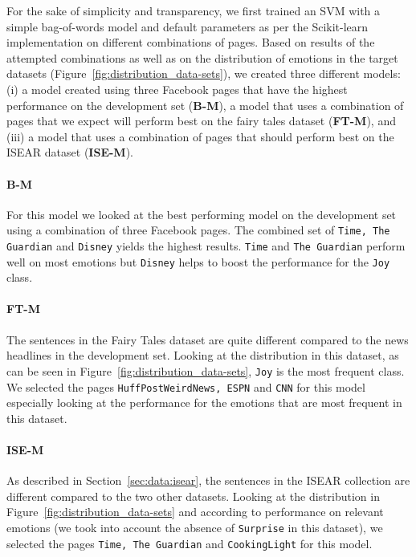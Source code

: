 \documentclass[11pt]{article}
\begin{document}
For the sake of simplicity and transparency, we first trained an SVM with a simple bag-of-words model and default parameters as per the Scikit-learn implementation \cite{scikit-learn} on different combinations of pages. Based on results of the attempted combinations as well as on the distribution of emotions in the target datasets (Figure~\ref{fig:distribution_data-sets}), we created three different models: (i) a model created using three Facebook pages that have the highest performance on the development set (\textbf{B-M}), a model that uses a combination of pages that we expect will perform best on the fairy tales dataset (\textbf{FT-M}), and (iii) a model that uses a combination of pages that should perform best on the ISEAR dataset (\textbf{ISE-M}).


\paragraph{B-M}
For this model we looked at the best performing model on the development set using a combination of three Facebook pages. The combined set of \texttt{Time, The Guardian} and \texttt{Disney} yields the highest results. \texttt{Time} and \texttt{The Guardian} perform well on most emotions but \texttt{Disney} helps to boost the performance for the \texttt{Joy} class.


\paragraph{FT-M}
The sentences in the Fairy Tales dataset are quite different compared to the news headlines in the development set. Looking at the distribution in this dataset, as can be seen in Figure~\ref{fig:distribution_data-sets}, \texttt{Joy} is the most frequent class. We selected the pages \texttt{HuffPostWeirdNews, ESPN} and \texttt{CNN} for this model especially looking at the performance for the emotions that are most frequent in this dataset.



\paragraph{ISE-M}
As described in Section~\ref{sec:data:isear}, the sentences in the ISEAR collection are different compared to the two other datasets. Looking at the distribution in Figure~\ref{fig:distribution_data-sets} and according to performance on relevant emotions (we took into account the absence of \texttt{Surprise} in this dataset), we selected the pages \texttt{Time, The Guardian} and \texttt{CookingLight} for this model. 
\end{document}
